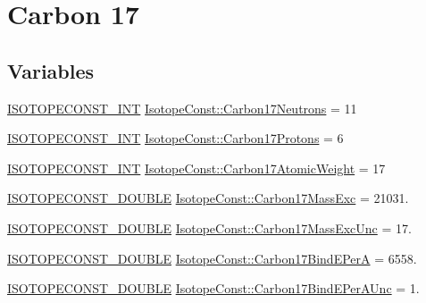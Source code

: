 \hypertarget{group___isotope_const-_carbon-_c17}{}\section{Carbon 17}
\label{group___isotope_const-_carbon-_c17}
\subsection*{Variables}
\begin{DoxyCompactItemize}
\item 
\mbox{\hyperlink{group___isotope_const-_macros_ga5f18360b3e99483a35c32d789e62621c}{I\+S\+O\+T\+O\+P\+E\+C\+O\+N\+S\+T\+\_\+\+I\+NT}} \mbox{\hyperlink{group___isotope_const-_carbon-_c17_ga97ed01a6378ef347cd993df8985aa3ee}{Isotope\+Const\+::\+Carbon17\+Neutrons}} = 11
\item 
\mbox{\hyperlink{group___isotope_const-_macros_ga5f18360b3e99483a35c32d789e62621c}{I\+S\+O\+T\+O\+P\+E\+C\+O\+N\+S\+T\+\_\+\+I\+NT}} \mbox{\hyperlink{group___isotope_const-_carbon-_c17_ga5a8fc99039780a05ad08799988c57a97}{Isotope\+Const\+::\+Carbon17\+Protons}} = 6
\item 
\mbox{\hyperlink{group___isotope_const-_macros_ga5f18360b3e99483a35c32d789e62621c}{I\+S\+O\+T\+O\+P\+E\+C\+O\+N\+S\+T\+\_\+\+I\+NT}} \mbox{\hyperlink{group___isotope_const-_carbon-_c17_ga5ecbe0190299e73cfc94030931c5e8c1}{Isotope\+Const\+::\+Carbon17\+Atomic\+Weight}} = 17
\item 
\mbox{\hyperlink{group___isotope_const-_macros_ga8f45a7272ce02c0b4c65c44636ed719a}{I\+S\+O\+T\+O\+P\+E\+C\+O\+N\+S\+T\+\_\+\+D\+O\+U\+B\+LE}} \mbox{\hyperlink{group___isotope_const-_carbon-_c17_ga2196ec465edccc36c9f5adff32600b4b}{Isotope\+Const\+::\+Carbon17\+Mass\+Exc}} = 21031.
\item 
\mbox{\hyperlink{group___isotope_const-_macros_ga8f45a7272ce02c0b4c65c44636ed719a}{I\+S\+O\+T\+O\+P\+E\+C\+O\+N\+S\+T\+\_\+\+D\+O\+U\+B\+LE}} \mbox{\hyperlink{group___isotope_const-_carbon-_c17_ga2ec3c6bbdc396d4e4c3f2c2c9def760d}{Isotope\+Const\+::\+Carbon17\+Mass\+Exc\+Unc}} = 17.
\item 
\mbox{\hyperlink{group___isotope_const-_macros_ga8f45a7272ce02c0b4c65c44636ed719a}{I\+S\+O\+T\+O\+P\+E\+C\+O\+N\+S\+T\+\_\+\+D\+O\+U\+B\+LE}} \mbox{\hyperlink{group___isotope_const-_carbon-_c17_gada666fd1f18bc2a701be1a83166eba4d}{Isotope\+Const\+::\+Carbon17\+Bind\+E\+PerA}} = 6558.
\item 
\mbox{\hyperlink{group___isotope_const-_macros_ga8f45a7272ce02c0b4c65c44636ed719a}{I\+S\+O\+T\+O\+P\+E\+C\+O\+N\+S\+T\+\_\+\+D\+O\+U\+B\+LE}} \mbox{\hyperlink{group___isotope_const-_carbon-_c17_gab14fa0f4f4b7e9bcef0b5f0fb65732f0}{Isotope\+Const\+::\+Carbon17\+Bind\+E\+Per\+A\+Unc}} = 1.

\end{DoxyCompactItemize}
